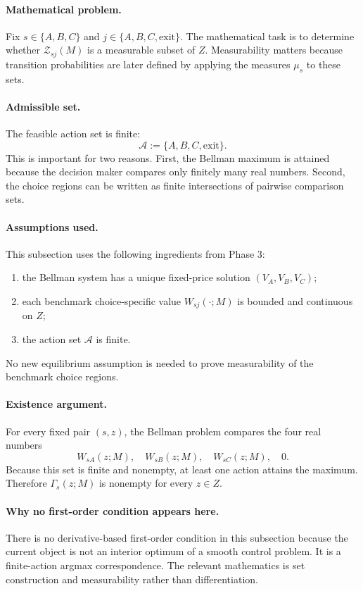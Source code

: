 \paragraph{Mathematical problem.}
Fix $s\in\{A,B,C\}$ and $j\in\{A,B,C,\mathrm{exit}\}$. The mathematical task is to determine whether $\mathcal Z_{sj}(M)$ is a measurable subset of $Z$. Measurability matters because transition probabilities are later defined by applying the measures $\mu_s$ to these sets.

\paragraph{Admissible set.}
The feasible action set is finite:
\[
\mathcal A:=\{A,B,C,\mathrm{exit}\}.
\]
This is important for two reasons. First, the Bellman maximum is attained because the decision maker compares only finitely many real numbers. Second, the choice regions can be written as finite intersections of pairwise comparison sets.

\paragraph{Assumptions used.}
This subsection uses the following ingredients from Phase 3:
\begin{enumerate}
    \item the Bellman system has a unique fixed-price solution $(V_A,V_B,V_C)$;
    \item each benchmark choice-specific value $W_{sj}(\cdot;M)$ is bounded and continuous on $Z$;
    \item the action set $\mathcal A$ is finite.
\end{enumerate}
No new equilibrium assumption is needed to prove measurability of the benchmark choice regions.

\paragraph{Existence argument.}
For every fixed pair $(s,z)$, the Bellman problem compares the four real numbers
\[
W_{sA}(z;M),\quad W_{sB}(z;M),\quad W_{sC}(z;M),\quad 0.
\]
Because this set is finite and nonempty, at least one action attains the maximum. Therefore $\Gamma_s(z;M)$ is nonempty for every $z\in Z$.

\paragraph{Why no first-order condition appears here.}
There is no derivative-based first-order condition in this subsection because the current object is not an interior optimum of a smooth control problem. It is a finite-action argmax correspondence. The relevant mathematics is set construction and measurability rather than differentiation.


